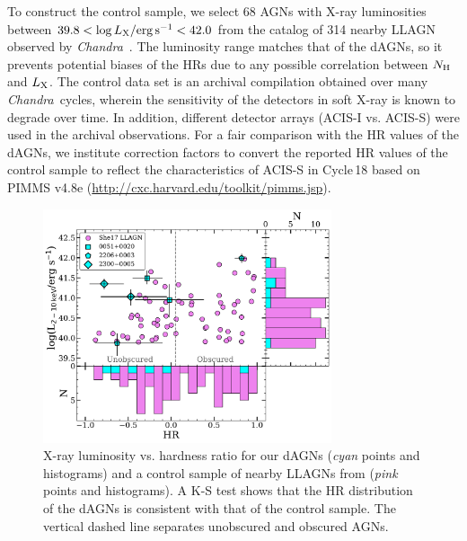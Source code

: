 \documentclass[iop,revtex4,twocolumn,apj,numberedappendix,appendixfloats]{emulateapj}
\newcommand{\chandra}{{\it Chandra}}
\begin{document}
To construct the control sample, we select 68 AGNs with X-ray luminosities between $39.8 < \log L_{\rm X}/{\rm erg\,s^{-1}} < 42.0$ from the catalog of 314 nearby LLAGN observed by \chandra\ \citep{She17}. The luminosity range matches that of the dAGNs, so it prevents potential biases of the HRs due to any possible correlation between $N_{\rm H}$ and $L_{\rm X}$. The control data set is an archival compilation obtained over many \chandra\ cycles, wherein the sensitivity of the detectors in soft X-ray is known to degrade over time. In addition, different detector arrays (ACIS-I vs. ACIS-S) were used in the archival observations. For a fair comparison with the HR values of the dAGNs, we institute correction factors to convert the reported HR values of the control sample to reflect the characteristics of ACIS-S in Cycle\,18 based on PIMMS v4.8e (\url{http://cxc.harvard.edu/toolkit/pimms.jsp}). 

\begin{figure}
\includegraphics[width=8.5cm]{figs/triple_plot_scale.pdf}
\caption{X-ray luminosity vs. hardness ratio for our dAGNs ({\it cyan} points and histograms) and a control sample of nearby LLAGNs from \citet{She17} ({\it pink} points and histograms). A K-S test shows that the HR distribution of the dAGNs is consistent with that of the control sample. The vertical dashed line separates unobscured and obscured AGNs.}
\label{fig:HR_compare}
\end{figure}
\end{document}
